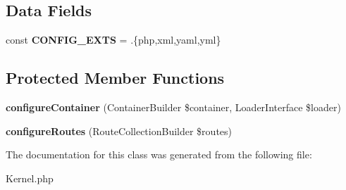 \subsection*{Data Fields}
\begin{DoxyCompactItemize}
\item 
\mbox{\label{class_app_1_1_kernel_a1294122fece91997b501ffa2c84786f2}} 
const {\bfseries C\+O\+N\+F\+I\+G\+\_\+\+E\+X\+TS} = \textquotesingle{}.\{php,xml,yaml,yml\}\textquotesingle{}
\end{DoxyCompactItemize}
\subsection*{Protected Member Functions}
\begin{DoxyCompactItemize}
\item 
\mbox{\label{class_app_1_1_kernel_a8309831536a0535383e4d41657b54635}} 
{\bfseries configure\+Container} (Container\+Builder \$container, Loader\+Interface \$loader)
\item 
\mbox{\label{class_app_1_1_kernel_a07bf0718482c124f9f0df16ddfa4329b}} 
{\bfseries configure\+Routes} (Route\+Collection\+Builder \$routes)
\end{DoxyCompactItemize}


The documentation for this class was generated from the following file\+:\begin{DoxyCompactItemize}
\item 
Kernel.\+php\end{DoxyCompactItemize}
